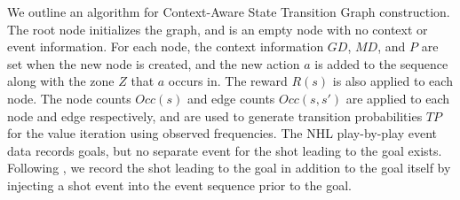 \documentclass[]{article}
\begin{document}
We outline an algorithm for Context-Aware State Transition Graph construction. The root node initializes the graph, and is an empty node with no context or event information. For each node, the context information $GD$, $MD$, and $P$ are set when the new node is created, and the new action $a$ is added to the sequence along with the zone $Z$ that $a$ occurs in. The reward $R(s)$ is also applied to each node.
The node counts $Occ(s)$ and edge counts $Occ(s,s')$ are applied to each node and edge respectively, and are used to generate transition probabilities $TP$ for the value iteration using observed frequencies. %
The NHL play-by-play event data records goals, but no separate event for the shot leading to the goal exists. Following \citep{Schuckers2013}, we record the shot leading to the goal in addition to the goal itself by injecting a shot event into the event sequence prior to the goal.
\end{document}

